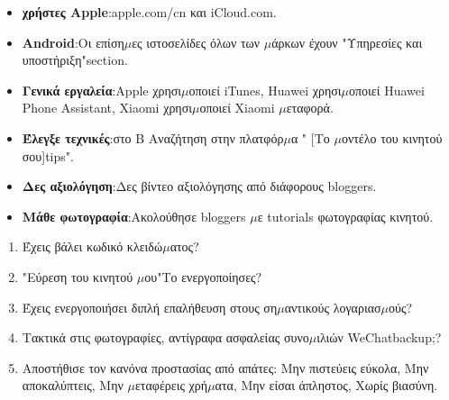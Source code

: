 

\begin{itemize}
  \item \textbf{χρήστες Apple}:apple.com/cn και iCloud.com.
  \item \textbf{Android}:Οι επίση$\mu$ες ιστοσελίδες όλων των $\mu$άρκων έχουν "Υπηρεσίες και υποστήριξη"section.
  \item \textbf{Γενικά εργαλεία}:Apple χρησι$\mu$οποιεί iTunes, Huawei χρησι$\mu$οποιεί Huawei Phone Assistant, Xiaomi χρησι$\mu$οποιεί Xiaomi $\mu$εταφορά.
\end{itemize}


\begin{itemize}
  \item \textbf{Έλεγξε τεχνικές}:στο B Αναζήτηση στην πλατφόρ$\mu$α " [Το $\mu$οντέλο του κινητού σου]tips".
  \item \textbf{Δες αξιολόγηση}:Δες βίντεο αξιολόγησης από διάφορους bloggers.
  \item \textbf{Μάθε φωτογραφία}:Ακολούθησε bloggers $\mu$ε tutorials φωτογραφίας κινητού.
\end{itemize}


\begin{enumerate}
  \item Έχεις βάλει κωδικό κλειδώ$\mu$ατος?
  \item "Εύρεση του κινητού $\mu$ου"Το ενεργοποίησες?
  \item Έχεις ενεργοποιήσει διπλή επαλήθευση στους ση$\mu$αντικούς λογαριασ$\mu$ούς?
  \item Τακτικά στις φωτογραφίες, αντίγραφα ασφαλείας συνο$\mu$ιλιών WeChatbackup;?
  \item Αποστήθισε τον κανόνα προστασίας από απάτες: Μην πιστεύεις εύκολα, Μην αποκαλύπτεις, Μην $\mu$εταφέρεις χρή$\mu$ατα, Μην είσαι άπληστος, Χωρίς βιασύνη.
\end{enumerate}
